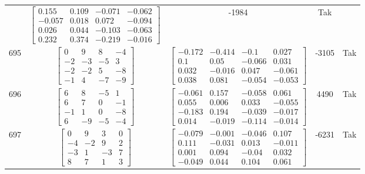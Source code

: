 \documentclass[a4paper,12pt]{article}
\begin{document}
\begin{tabular}{c c c c c}
&
$\begin{bmatrix} 0.155 & 0.109 & -0.071 & -0.062 \\ -0.057 & 0.018 & 0.072 & -0.094 \\ 0.026 & 0.044 & -0.103 & -0.063 \\ 0.232 & 0.374 & -0.219 & -0.016 \end{bmatrix}$
&
-1984
&
Tak
\\
695
&
$\begin{bmatrix} 0 & 9 & 8 & -4 \\ -2 & -3 & -5 & 3 \\ -2 & -2 & 5 & -8 \\ -1 & 4 & -7 & -9 \end{bmatrix}$
&
$\begin{bmatrix} -0.172 & -0.414 & -0.1 & 0.027 \\ 0.1 & 0.05 & -0.066 & 0.031 \\ 0.032 & -0.016 & 0.047 & -0.061 \\ 0.038 & 0.081 & -0.054 & -0.053 \end{bmatrix}$
&
-3105
&
Tak
\\
696
&
$\begin{bmatrix} 6 & 8 & -5 & 1 \\ 6 & 7 & 0 & -1 \\ -1 & 1 & 0 & -8 \\ 6 & -9 & -5 & -4 \end{bmatrix}$
&
$\begin{bmatrix} -0.061 & 0.157 & -0.058 & 0.061 \\ 0.055 & 0.006 & 0.033 & -0.055 \\ -0.183 & 0.194 & -0.039 & -0.017 \\ 0.014 & -0.019 & -0.114 & -0.014 \end{bmatrix}$
&
4490
&
Tak
\\
697
&
$\begin{bmatrix} 0 & 9 & 3 & 0 \\ -4 & -2 & 9 & 2 \\ -3 & 1 & -3 & 7 \\ 8 & 7 & 1 & 3 \end{bmatrix}$
&
$\begin{bmatrix} -0.079 & -0.001 & -0.046 & 0.107 \\ 0.111 & -0.031 & 0.013 & -0.011 \\ 0.001 & 0.094 & -0.04 & 0.032 \\ -0.049 & 0.044 & 0.104 & 0.061 \end{bmatrix}$
&
-6231
&
Tak
\\

\end{tabular}
\end{document}
